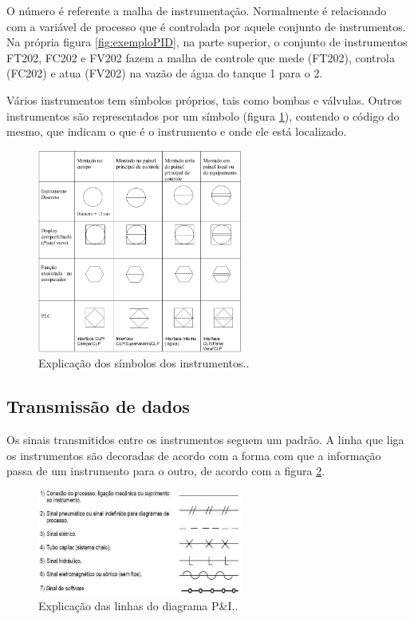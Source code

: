 O número é referente a malha de instrumentação. Normalmente é relacionado com a variável de processo que é controlada por aquele conjunto de instrumentos. Na própria figura \ref{fig:exemploPID}, na parte superior, o conjunto de instrumentos FT202, FC202 e FV202 fazem a malha de controle que mede (FT202), controla (FC202) e atua (FV202) na vazão de água do tanque 1 para o 2.

Vários instrumentos tem símbolos próprios, tais como bombas e válvulas. Outros instrumentos são representados por um símbolo (figura \ref{fig:simbolosISA}), contendo o código do mesmo, que indicam o que é o instrumento e onde ele está localizado.
\begin{figure}[h]
  \centering
  \includegraphics[width = 0.6\textwidth]{figuras/simbolosISA}
  \caption{Explicação dos símbolos dos instrumentos.\label{fig:simbolosISA}.}
\end{figure}

\subsection{Transmissão de dados}
\label{sub:Transmissão de dados}

Os sinais transmitidos entre os instrumentos seguem um padrão. A linha que liga os instrumentos são decoradas de acordo com a forma com que a informação passa de um instrumento para o outro, de acordo com a figura \ref{fig:linhasISA}.
\begin{figure}[h]
  \centering
  \includegraphics[width = 0.6\textwidth]{figuras/linhasISA}
  \caption{Explicação das linhas do diagrama P\&I.\label{fig:linhasISA}.}
\end{figure}

